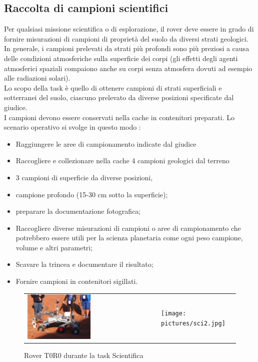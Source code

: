 \documentclass[%
corpo=11pt,
twoside,
 stile=classica,
oldstyle,
greek,%
]{toptesi}
\begin{document}
		\subsection{Raccolta di campioni scientifici}
		
		Per qualsiasi missione scientifica o di esplorazione, il rover deve essere in grado di fornire misurazioni di campioni di proprietà del suolo da diversi strati geologici. \\
		In generale, i campioni prelevati da strati più profondi sono più preziosi a causa delle condizioni atmosferiche sulla superficie dei corpi (gli effetti degli agenti atmosferici spaziali compaiono anche su corpi senza atmosfera dovuti ad esempio alle radiazioni solari).\\
		
		Lo scopo della task è quello di ottenere campioni di strati superficiali e sotterranei del suolo, ciascuno prelevato da diverse posizioni specificate dal giudice. \\
		I campioni devono essere conservati nella cache in contenitori preparati.
		Lo scenario operativo si svolge in questo modo : 
		\begin{itemize}
			\item Raggiungere  le aree di campionamento indicate dal giudice 
			\item Raccogliere e collezionare nella cache 4 campioni geologici dal terreno
			\item 3 campioni di superficie da diverse posizioni,
			\item campione profondo (15-30 cm sotto la superficie);
			\item preparare la documentazione fotografica;
			\item Raccogliere diverse misurazioni di campioni o aree di campionamento che potrebbero essere utili
			per la scienza planetaria come ogni peso campione, volume e altri parametri;
			\item Scavare la trincea e documentare il risultato;
			\item Fornire campioni in contenitori sigillati.
		\end{itemize}
		\begin{figure}
			\centering
			\begin{tabular}{ll}
				\includegraphics[width=0.5\textwidth]{pictures/sci1.jpg}
				&
				\texttt{[image: pictures/sci2.jpg]}
			\end{tabular}
			\caption{Rover T0R0 durante la task Scientifica}
			\label{fig:science}
		\end{figure}
\end{document}
